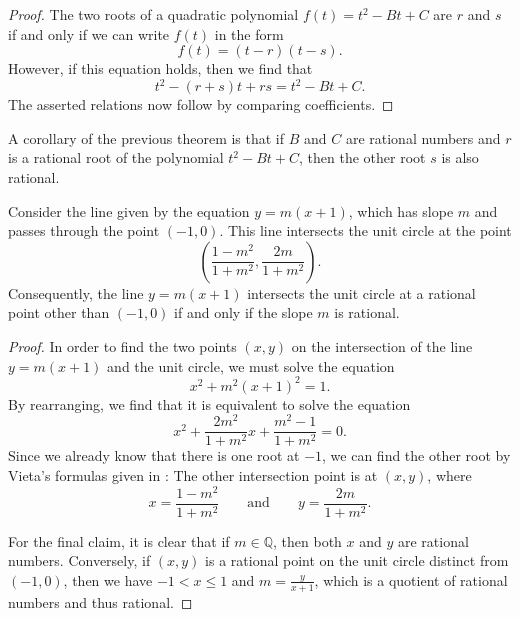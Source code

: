 \begin{proof}
  The two roots of a quadratic polynomial $f(t)=t^2-Bt+C$ are $r$ and $s$ if and only if we can write $f(t)$ in the form
  \begin{equation*}
    f(t)=(t-r)(t-s).
  \end{equation*}
  However, if this equation holds, then we find that
  \begin{equation*}
    t^2-(r+s)t+rs=t^2-Bt+C.
  \end{equation*}
  The asserted relations now follow by comparing coefficients.
\end{proof}

A corollary of the previous theorem is that if $B$ and $C$ are rational numbers and $r$ is a rational root of the polynomial $t^2-Bt+C$, then the other root $s$ is also rational.

\begin{theorem}\label{theorem:stereographic-projection-unit-circle}
  Consider the line given by the equation $y=m(x+1)$, which has slope $m$ and passes through the point $(-1,0)$. This line intersects the unit circle at the point
  \begin{equation*}
    \left(\frac{1-m^2}{1+m^2},\frac{2m}{1+m^2}\right).
  \end{equation*}
  Consequently, the line $y=m(x+1)$ intersects the unit circle at a rational point other than $(-1,0)$ if and only if the slope $m$ is rational.
\end{theorem}

\begin{proof}
  In order to find the two points $(x,y)$ on the intersection of the line $y=m(x+1)$ and the unit circle, we must solve the equation
  \begin{equation*}
    x^2+m^2(x+1)^2=1.
  \end{equation*}
  By rearranging, we find that it is equivalent to solve the equation
  \begin{equation*}
    x^2 + \frac{2m^2}{1+m^2}x + \frac{m^2-1}{1+m^2} = 0.
  \end{equation*}
  Since we already know that there is one root at $-1$, we can find the other root by Vieta's formulas given in : The other intersection point is at $(x,y)$, where
  \begin{equation*}
    x=\frac{1-m^2}{1+m^2}\qquad\text{and}\qquad y=\frac{2m}{1+m^2}.
  \end{equation*}

  For the final claim, it is clear that if $m \in \mathbb{Q}$, then both $x$ and $y$ are rational numbers. Conversely, if $(x,y)$ is a rational point on the unit circle distinct from $(-1,0)$, then we have $-1<x\leq 1$ and $m = \tfrac{y}{x+1}$, which is a quotient of rational numbers and thus rational.
\end{proof}

